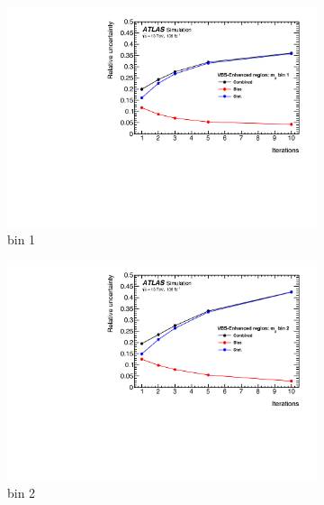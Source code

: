 \begin{figure}[htb]
    \centering
    \begin{subfigure}{.48\textwidth}
        \centering
        \includegraphics[width=.9\linewidth]{figures/Analysis/Unfolding/unfoldingbias/unfolding_bias_stat_unc_mjj_VBSEnh_bin1.pdf}
        \caption{ bin 1}
    \end{subfigure}
    \begin{subfigure}{.48\textwidth}
        \centering
        \includegraphics[width=.9\linewidth]{figures/Analysis/Unfolding/unfoldingbias/unfolding_bias_stat_unc_mjj_VBSEnh_bin2.pdf}
        \caption{bin 2 }
    \end{subfigure}\\
    \begin{subfigure}{.48\textwidth}
        \centering

\end{subfigure}
\end{figure}
